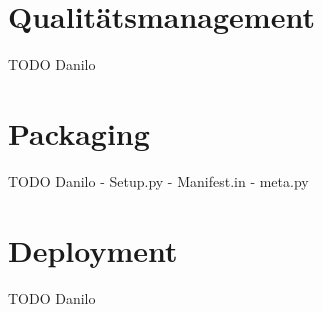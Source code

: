 

\section{Qualitätsmanagement}
\label{swidgenerator:architektur:qa}

TODO Danilo



\section{Packaging}
TODO Danilo
- Setup.py
- Manifest.in
- meta.py



\section{Deployment}
\label{swidgenerator:architektur:deployment}
TODO Danilo

